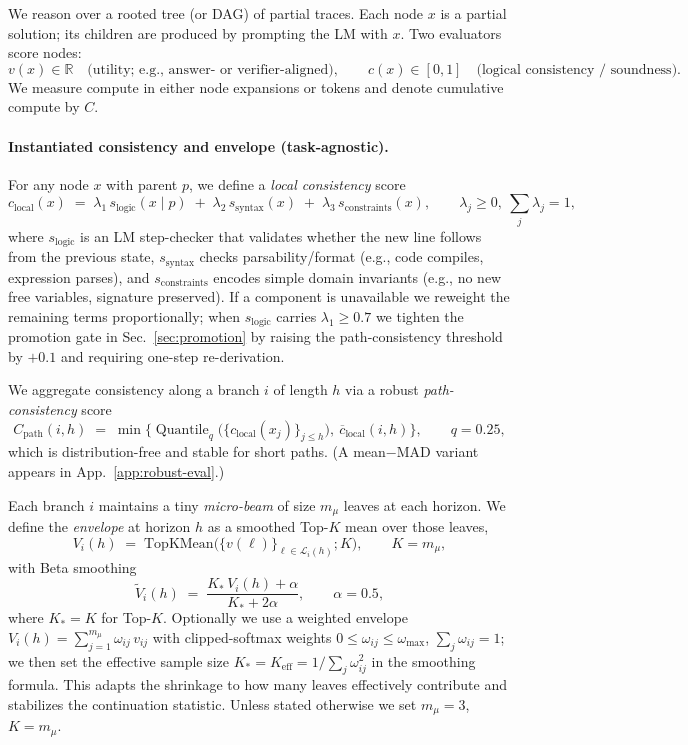 \documentclass{article}
\begin{document}
We reason over a rooted tree (or DAG) of partial traces.
Each node $x$ is a partial solution; its children are produced by prompting the LM with $x$.
Two evaluators score nodes:
\[
v(x) \in \mathbb{R} \quad \text{(utility; e.g., answer- or verifier-aligned)}, \qquad
c(x) \in [0,1] \quad \text{(logical consistency / soundness)}.
\]
We measure compute in either node expansions or tokens and denote cumulative compute by $C$.


\paragraph{Instantiated consistency and envelope (task-agnostic).}
For any node $x$ with parent $p$, we define a \emph{local consistency} score
\begin{equation}
c_{\text{local}}(x)\;=\;\lambda_1\,s_{\text{logic}}(x\mid p)\;+\;\lambda_2\,s_{\text{syntax}}(x)\;+\;\lambda_3\,s_{\text{constraints}}(x),
\qquad \lambda_j\!\ge 0,\ \sum_j \lambda_j=1,
\end{equation}
where $s_{\text{logic}}$ is an LM step-checker that validates whether the new line follows from the previous state,
$s_{\text{syntax}}$ checks parsability/format (e.g., code compiles, expression parses), and
$s_{\text{constraints}}$ encodes simple domain invariants (e.g., no new free variables, signature preserved).
If a component is unavailable we reweight the remaining terms proportionally; when $s_{\text{logic}}$ carries $\lambda_1\ge 0.7$ we tighten the promotion gate in Sec.~\ref{sec:promotion} by raising the path-consistency threshold by $+0.1$ and requiring one-step re-derivation.

We aggregate consistency along a branch $i$ of length $h$ via a robust \emph{path-consistency} score
\begin{equation}
C_{\text{path}}(i,h)\;=\;\min\!\Big\{\operatorname{Quantile}_{q}\big(\{c_{\text{local}}(x_j)\}_{j\le h}\big),\ \overline{c}_{\text{local}}(i,h)\Big\},
\qquad q=0.25,
\end{equation}
which is distribution-free and stable for short paths. (A mean$-$MAD variant appears in App.~\ref{app:robust-eval}.)

Each branch $i$ maintains a tiny \emph{micro-beam} of size $m_{\mu}$ leaves at each horizon.
We define the \emph{envelope} at horizon $h$ as a smoothed Top-$K$ mean over those leaves,
\begin{equation}
V_i(h)\;=\;\text{TopKMean}\big(\{v(\ell)\}_{\ell\in\mathcal{L}_i(h)};K\big),\qquad K=m_{\mu},
\end{equation}
with Beta smoothing
\begin{equation}
\tilde V_i(h)\;=\;\frac{K_{*}\, V_i(h)+\alpha}{K_{*}+2\alpha},\qquad \alpha=0.5,
\end{equation}
where $K_{*}{=}K$ for Top-$K$.
Optionally we use a weighted envelope $V_i(h)=\sum_{j=1}^{m_\mu}\omega_{ij}\,v_{ij}$ with clipped-softmax weights $0\!\le\!\omega_{ij}\!\le\!\omega_{\max}$, $\sum_j\omega_{ij}{=}1$;
we then set the effective sample size $K_{*}{=}K_{\mathrm{eff}}=1/\sum_j \omega_{ij}^2$ in the smoothing formula.
This adapts the shrinkage to how many leaves effectively contribute and stabilizes the continuation statistic.
Unless stated otherwise we set $m_{\mu}{=}3$, $K{=}m_{\mu}$.
\end{document}

